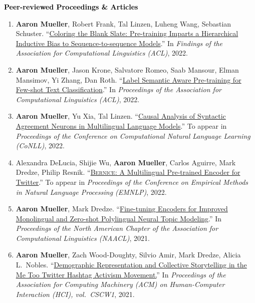 \documentclass[10pt]{article}
\renewcommand{\subsection}[1]{\textcolor{black}{#1}}
\providecommand*\titlelink[2]{\href{#1}{\textcolor{accent}{#2}}}
\begin{document}
	\subsection{\textbf{Peer-reviewed Proceedings \& Articles}}
	\begin{enumerate}[leftmargin=*, topsep=0pt, itemsep=0.25ex, partopsep=0ex, parsep=1ex]
	\item \textbf{Aaron Mueller}, Robert Frank, Tal Linzen, Luheng Wang, Sebastian Schuster. ``\titlelink{https://aclanthology.org/2022.findings-acl.106.pdf}{Coloring the Blank Slate: Pre-training Imparts a Hierarchical Inductive Bias to Sequence-to-sequence Models}.'' In \emph{Findings of the Association for Computational Linguistics (ACL)}, 2022.

	\item \textbf{Aaron Mueller}, Jason Krone, Salvatore Romeo, Saab Mansour, Elman Mansimov, Yi Zhang, Dan Roth. ``\titlelink{https://aclanthology.org/2022.acl-long.570/}{Label Semantic Aware Pre-training for Few-shot Text Classification}.'' In \emph{Proceedings of the Association for Computational Linguistics (ACL)}, 2022.\label{pub:lsap}
	
	\item \textbf{Aaron Mueller}, Yu Xia, Tal Linzen. ``\titlelink{https://arxiv.org/abs/2210.14328}{Causal Analysis of Syntactic Agreement Neurons in Multilingual Language Models}.'' To appear in \emph{Proceedings of the Conference on Computational Natural Language Learning (CoNLL)}, 2022.\label{pub:causal-multiling}
	
	\item Alexandra DeLucia, Shijie Wu, \textbf{Aaron Mueller}, Carlos Aguirre, Mark Dredze, Philip Resnik. ``\titlelink{https://preview.aclanthology.org/emnlp-22-ingestion/2022.emnlp-main.415/}{\textsc{Bernice}: A Multilingual Pre-trained Encoder for Twitter}.'' To appear in \emph{Proceedings of the Conference on Empirical Methods in Natural Language Processing (EMNLP)}, 2022.
			
	\item \textbf{Aaron Mueller}, Mark Dredze. ``\titlelink{https://aclanthology.org/2021.naacl-main.243/}{Fine-tuning Encoders for Improved Monolingual and Zero-shot Polylingual Neural Topic Modeling}.'' In \emph{Proceedings of the North American Chapter of the Association for Computational Linguistics (NAACL)}, 2021.  
	
	\item \textbf{Aaron Mueller}, Zach Wood-Doughty, Silvio Amir, Mark Dredze, Alicia L.\ Nobles. ``\titlelink{https://dl.acm.org/doi/10.1145/3449181}{Demographic Representation and Collective Storytelling in the Me Too Twitter Hashtag Activism Movement.}'' In \emph{Proceedings of the Association for Computing Machinery (ACM) on Human-Computer Interaction (HCI), vol.\ CSCW1}, 2021.


\end{enumerate}
\end{document}

